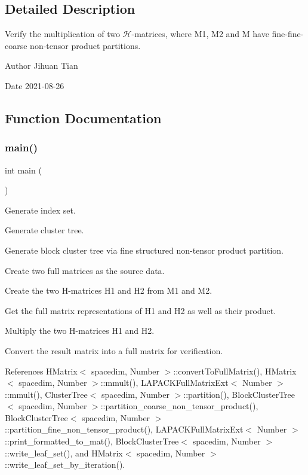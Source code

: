 \subsection{Detailed Description}
Verify the multiplication of two $\mathcal{H}$-\/matrices, where M1, M2 and M have fine-\/fine-\/coarse non-\/tensor product partitions. 

\begin{DoxyAuthor}{Author}
Jihuan Tian 
\end{DoxyAuthor}
\begin{DoxyDate}{Date}
2021-\/08-\/26 
\end{DoxyDate}


\subsection{Function Documentation}
\mbox{\label{hmatrix-hmatrix-mmult-fine-fine-coarse-ntp_8cc_ae66f6b31b5ad750f1fe042a706a4e3d4}} 
\subsubsection{\texorpdfstring{main()}{main()}}
{\footnotesize\ttfamily int main (\begin{DoxyParamCaption}{ }\end{DoxyParamCaption})}

Generate index set.

Generate cluster tree.

Generate block cluster tree via fine structured non-\/tensor product partition.

Create two full matrices as the source data.

Create the two H-\/matrices {\ttfamily H1} and {\ttfamily H2} from {\ttfamily M1} and {\ttfamily M2}.

Get the full matrix representations of {\ttfamily H1} and {\ttfamily H2} as well as their product.

Multiply the two H-\/matrices {\ttfamily H1} and {\ttfamily H2}.

Convert the result matrix into a full matrix for verification.

References H\+Matrix$<$ spacedim, Number $>$\+::convert\+To\+Full\+Matrix(), H\+Matrix$<$ spacedim, Number $>$\+::mmult(), L\+A\+P\+A\+C\+K\+Full\+Matrix\+Ext$<$ Number $>$\+::mmult(), Cluster\+Tree$<$ spacedim, Number $>$\+::partition(), Block\+Cluster\+Tree$<$ spacedim, Number $>$\+::partition\+\_\+coarse\+\_\+non\+\_\+tensor\+\_\+product(), Block\+Cluster\+Tree$<$ spacedim, Number $>$\+::partition\+\_\+fine\+\_\+non\+\_\+tensor\+\_\+product(), L\+A\+P\+A\+C\+K\+Full\+Matrix\+Ext$<$ Number $>$\+::print\+\_\+formatted\+\_\+to\+\_\+mat(), Block\+Cluster\+Tree$<$ spacedim, Number $>$\+::write\+\_\+leaf\+\_\+set(), and H\+Matrix$<$ spacedim, Number $>$\+::write\+\_\+leaf\+\_\+set\+\_\+by\+\_\+iteration().


